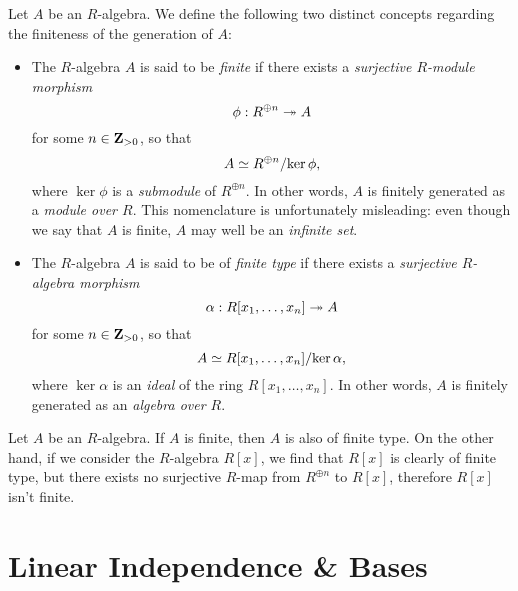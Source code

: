 \begin{definition}
    \label{def:finite-generation-algebras}
    Let \(A\) be an \(R\)-algebra. We define the following two distinct concepts
    regarding the finiteness of the generation of \(A\):
    \begin{itemize}[(a)]\setlength\itemsep{0em}
        \item The \(R\)-algebra \(A\) is said to be \emph{finite} if there exists a
              \emph{surjective \(R\)-module morphism}
              \[
                  \phi: R^{\oplus n} \twoheadrightarrow A
              \]
              for some \(n \in \mathbf{Z}_{>0}\), so that
              \[
                  A \simeq R^{\oplus n}/{\ker \phi},
              \]
              where \(\ker \phi\) is a \emph{submodule} of \(R^{\oplus n}\). In other words,
              \(A\) is finitely generated as a \emph{module over \(R\)}. This nomenclature
              is unfortunately misleading: even though we say that \(A\) is finite, \(A\) may
              well be an \emph{infinite set}.

        \item The \(R\)-algebra \(A\) is said to be of \emph{finite type} if there
              exists a \emph{surjective \(R\)-algebra morphism}
              \[
                  \alpha: R[x_1, \dots, x_n] \twoheadrightarrow A
              \]
              for some \(n \in \mathbf{Z}_{>0}\), so that
              \[
                  A \simeq R[x_1, \dots, x_n]/{\ker \alpha},
              \]
              where \(\ker \alpha\) is an \emph{ideal} of the ring \(R[x_1, \dots,
                      x_n]\). In other words, \(A\) is finitely generated as an \emph{algebra over
                  \(R\)}.
    \end{itemize}
\end{definition}

\begin{remark}
    \label{rem:finite-type-not-finite}
    Let \(A\) be an \(R\)-algebra. If \(A\) is finite, then \(A\) is also of finite
    type. On the other hand, if we consider the \(R\)-algebra \(R[x]\), we find that
    \(R[x]\) is clearly of finite type, but there exists no surjective \(R\)-map
    from \(R^{\oplus n}\) to \(R[x]\), therefore \(R[x]\) isn't finite.
\end{remark}

\section{Linear Independence \& Bases}

